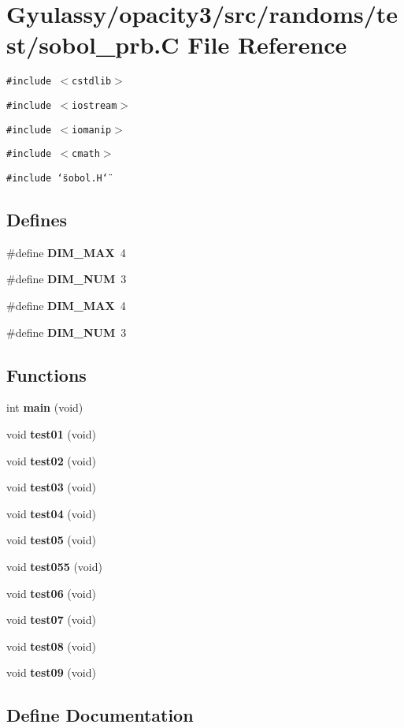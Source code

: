 \section{Gyulassy/opacity3/src/randoms/test/sobol\_\-prb.C File Reference}
\label{sobol__prb_8C}
{\tt \#include $<$cstdlib$>$}\par
{\tt \#include $<$iostream$>$}\par
{\tt \#include $<$iomanip$>$}\par
{\tt \#include $<$cmath$>$}\par
{\tt \#include \char`\"{}sobol.H\char`\"{}}\par
\subsection*{Defines}
\begin{CompactItemize}
\item 
\#define {\bf DIM\_\-MAX}~4
\item 
\#define {\bf DIM\_\-NUM}~3
\item 
\#define {\bf DIM\_\-MAX}~4
\item 
\#define {\bf DIM\_\-NUM}~3
\end{CompactItemize}
\subsection*{Functions}
\begin{CompactItemize}
\item 
int {\bf main} (void)
\item 
void {\bf test01} (void)
\item 
void {\bf test02} (void)
\item 
void {\bf test03} (void)
\item 
void {\bf test04} (void)
\item 
void {\bf test05} (void)
\item 
void {\bf test055} (void)
\item 
void {\bf test06} (void)
\item 
void {\bf test07} (void)
\item 
void {\bf test08} (void)
\item 
void {\bf test09} (void)
\end{CompactItemize}


\subsection{Define Documentation}

